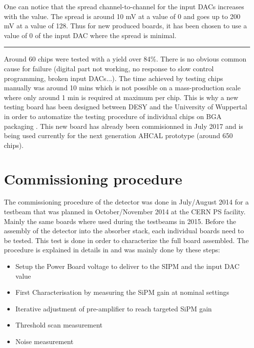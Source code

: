 One can notice that the spread channel-to-channel for the input DACs increases with the value. The spread is around 10 mV at a value of 0 and goes up to 200 mV at a value of 128. Thus for new produced boards, it has been chosen to use a value of 0 of the input DAC where the spread is minimal.

\begin{center}
  \rule{0.5\textwidth}{.4pt}
\end{center}

Around 60 chips were tested with a yield over 84\%. There is no obvious common cause for failure (digital part not working, no response to slow control programming, broken input DACs...). The time achieved by testing chips manually was around 10 mins which is not possible on a mass-production scale where only around 1 min is required at maximum per chip. This is why a new testing board has been designed between DESY and the University of Wuppertal in order to automatize the testing procedure of individual chips on BGA packaging \cite{AHCALMain2016_Amine}. This new board has already been commisionned in July 2017 and is being used currently for the next generation AHCAL prototype (around 650 chips).

\section{Commissioning procedure}

The commissioning procedure of the detector was done in July/August 2014 for a testbeam that was planned in October/November 2014 at the CERN PS facility. Mainly the same boards where used during the testbeams in 2015. Before the assembly of the detector into the absorber stack, each individual boards need to be tested. This test is done in order to characterize the full board assembled. The procedure is explained in details in \cite{} and was mainly done by these steps:

\begin{itemize}
  \item Setup the Power Board voltage to deliver to the SIPM and the input DAC value
  \item First Characterisation by measuring the SiPM gain at nominal settings
  \item Iterative adjustment of pre-amplifier to reach targeted SiPM gain
  \item Threshold scan measurement
  \item Noise measurement
\end{itemize}

